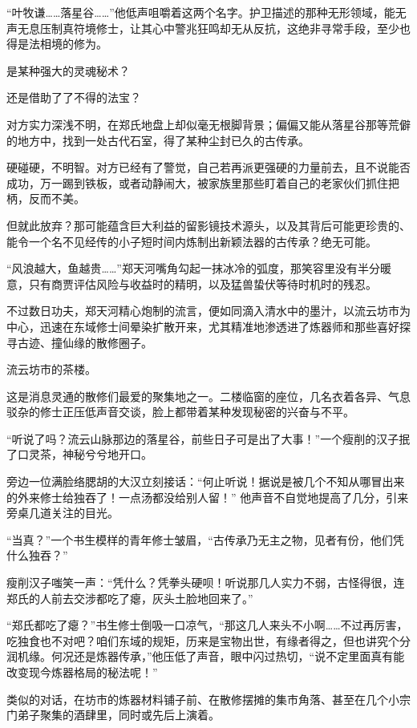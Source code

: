 “叶牧谦……落星谷……”他低声咀嚼着这两个名字。护卫描述的那种无形领域，能无声无息压制真符境修士，让其心中警兆狂鸣却无从反抗，这绝非寻常手段，至少也得是法相境的修为。

是某种强大的灵魂秘术？

还是借助了了不得的法宝？

对方实力深浅不明，在郑氏地盘上却似毫无根脚背景；偏偏又能从落星谷那等荒僻的地方中，找到一处古代石室，得了某种尘封已久的古传承。

硬碰硬，不明智。对方已经有了警觉，自己若再派更强硬的力量前去，且不说能否成功，万一踢到铁板，或者动静闹大，被家族里那些盯着自己的老家伙们抓住把柄，反而不美。

但就此放弃？那可能蕴含巨大利益的留影镜技术源头，以及其背后可能更珍贵的、能令一个名不见经传的小子短时间内炼制出新颖法器的古传承？绝无可能。

“风浪越大，鱼越贵……”郑天河嘴角勾起一抹冰冷的弧度，那笑容里没有半分暖意，只有商贾评估风险与收益时的精明，以及猛兽蛰伏等待时机时的残忍。

\vspace{2em}

不过数日功夫，郑天河精心炮制的流言，便如同滴入清水中的墨汁，以流云坊市为中心，迅速在东域修士间晕染扩散开来，尤其精准地渗透进了炼器师和那些喜好探寻古迹、撞仙缘的散修圈子。

流云坊市的茶楼。

这是消息灵通的散修们最爱的聚集地之一。二楼临窗的座位，几名衣着各异、气息驳杂的修士正压低声音交谈，脸上都带着某种发现秘密的兴奋与不平。

“听说了吗？流云山脉那边的落星谷，前些日子可是出了大事！”一个瘦削的汉子抿了口灵茶，神秘兮兮地开口。

旁边一位满脸络腮胡的大汉立刻接话：“何止听说！据说是被几个不知从哪冒出来的外来修士给独吞了！一点汤都没给别人留！” 他声音不自觉地提高了几分，引来旁桌几道关注的目光。

“当真？”一个书生模样的青年修士皱眉，“古传承乃无主之物，见者有份，他们凭什么独吞？”

瘦削汉子嗤笑一声：“凭什么？凭拳头硬呗！听说那几人实力不弱，古怪得很，连郑氏的人前去交涉都吃了瘪，灰头土脸地回来了。”

“郑氏都吃了瘪？”书生修士倒吸一口凉气，“那这几人来头不小啊……不过再厉害，吃独食也不对吧？咱们东域的规矩，历来是宝物出世，有缘者得之，但也讲究个分润机缘。何况还是炼器传承，”他压低了声音，眼中闪过热切，“说不定里面真有能改变现今炼器格局的秘法呢！”

类似的对话，在坊市的炼器材料铺子前、在散修摆摊的集市角落、甚至在几个小宗门弟子聚集的酒肆里，同时或先后上演着。

